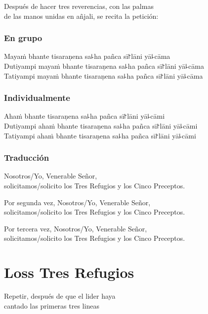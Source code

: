 \begin{instruction}
  Después de hacer tres reverencias, con las palmas\\
  de las manos unidas en añjali, se recita la petición:
\end{instruction}

\subsection{En grupo}

Mayaṁ bhante tisaraṇena sa꜕ha pañca sī꜓lāni yā꜕cāma\\
Dutiyampi mayaṁ bhante tisaraṇena sa꜕ha pañca sī꜓lāni yā꜕cāma\\
Tatiyampi mayaṁ bhante tisaraṇena sa꜕ha pañca sī꜓lāni yā꜕cāma

\subsection{Individualmente}

Ahaṁ bhante tisaraṇena sa꜕ha pañca sī꜓lāni yā꜕cāmi\\
Dutiyampi ahaṁ bhante tisaraṇena sa꜕ha pañca sī꜓lāni yā꜕cāmi\\
Tatiyampi ahaṁ bhante tisaraṇena sa꜕ha pañca sī꜓lāni yā꜕cāmi

\subsection{Traducción}

\begin{english}
  Nosotros/Yo, Venerable Señor,\\
  \vin solicitamos/solicito los Tres Refugios y los Cinco Preceptos.
  
  Por segunda vez, Nosotros/Yo, Venerable Señor,\\
  \vin solicitamos/solicito los Tres Refugios y los Cinco Preceptos.
  
  Por tercera vez, Nosotros/Yo, Venerable Señor,\\
  \vin solicitamos/solicito los Tres Refugios y los Cinco Preceptos.
\end{english}

\clearpage
\chapter{Loss Tres Refugios}

\begin{instruction}
  Repetir, después de que el lider haya\\
  cantado las primeras tres lineas
\end{instruction}

